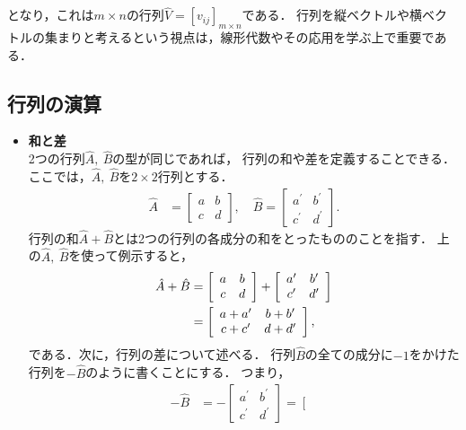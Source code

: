 となり，これは$m\times n$の行列$\hat{V}=\left[v_{ij}\right]_{m\times n}$である．
行列を縦ベクトルや横ベクトルの集まりと考えるという視点は，線形代数やその応用を学ぶ上で重要である．
%
%
\subsection{行列の演算\label{sec:mat_operation}}
%
\begin{itemize}
\item \textbf{和と差}\\
%
2つの行列$\hat{A},~\hat{B}$の型が同じであれば，
行列の和や差を定義することできる．
ここでは，$\hat{A},~\hat{B}$を$2\times 2$行列とする．
%
\begin{align}
\hat{A} & =\left[\begin{array}{cc}
a & b\\
c & d
\end{array}\right],\quad\hat{B}=\left[\begin{array}{cc}
a^{\prime} & b^{\prime}\\
c^{\prime} & d^{\prime}
\end{array}\right].
\end{align}
%
行列の和$\hat{A}+\hat{B}$とは2つの行列の各成分の和をとったもののことを指す．
上の$\hat{A},~\hat{B}$を使って例示すると，
%
\begin{align}
\hat{A}+\hat{B} & =\left[\begin{array}{cc}
a & b\\
c & d
\end{array}\right]+\left[\begin{array}{cc}
a^{\prime} & b^{\prime}\\
c^{\prime} & d^{\prime}
\end{array}\right]\notag\\
 & =\left[\begin{array}{cc}
a+a^{\prime} & b+b^{\prime}\\
c+c^{\prime} & d+d^{\prime}
\end{array}\right],
\end{align}
である．次に，行列の差について述べる．
%
行列$\hat{B}$の全ての成分に$-1$をかけた行列を$-\hat{B}$のように書くことにする．
つまり，
\begin{align}
-\hat{B} & =-\left[\begin{array}{cc}
a^{\prime} & b^{\prime}\\
c^{\prime} & d^{\prime}
\end{array}\right]=\left[\begin{array}{cc}

\end{array}
\end{align}
\end{itemize}
